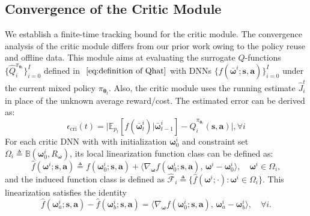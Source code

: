 \documentclass{IEEEtran}
\begin{document}
\subsection{Convergence of the Critic Module}
We establish a finite-time tracking bound for the critic module. The convergence analysis of the critic module differs from our prior work owing to the policy reuse and offline data. This module aims at evaluating the surrogate $Q$-functions $\{\hat{Q}_{i}^{\pi_{\boldsymbol{\theta}_{t}}}\}_{i=0}^{I}$ defined in $~\eqref{eq:definition of Qhat}$ with DNNs $\{f(\bar{\boldsymbol{\omega}}^{i};\boldsymbol{s},\boldsymbol{a})\}_{i=0}^{I}$ under the current mixed policy $\pi_{\boldsymbol{\theta}_{t}}$. Also, the critic module uses the running estimate $\hat{J}_{i}^{t}$ in place of the unknown average reward/cost. The estimated error can be derived as:
\begin{equation}
\epsilon_{\mathrm{cri}}(t)=\bigl|\mathbb{E_{\mathrm{\mathit{p_{t}}}}}[f(\bar{\boldsymbol{\omega}}_{t}^{i})|\bar{\boldsymbol{\omega}}_{t-1}^{i}]-\hat{Q}_{i}^{\pi_{\boldsymbol{\theta}_{t}}}(\boldsymbol{s},\boldsymbol{a})\bigr|,\forall i\label{eq:critic_error}
\end{equation}
For each critic DNN with with initialization $\boldsymbol{\omega}_{0}^{i}$ and constraint set $\Omega_{i}\triangleq\mathbb{B}(\boldsymbol{\omega}_{0}^{i},R_{\boldsymbol{\omega}})$, its local linearization function class can be defined as:
\begin{equation}
\hat{f}(\boldsymbol{\omega}^{i};\boldsymbol{s},\boldsymbol{a})\triangleq f(\boldsymbol{\omega}_{0}^{i};\boldsymbol{s},\boldsymbol{a})+\bigl\langle\nabla_{\boldsymbol{\omega}}f(\boldsymbol{\omega}_{0}^{i};\boldsymbol{s},\boldsymbol{a}),\,\boldsymbol{\omega}^{i}-\boldsymbol{\omega}_{0}^{i}\bigr\rangle,\quad\boldsymbol{\omega}^{i}\in\Omega_{i},\label{eq:local_linearization}
\end{equation}
and the induced function class is defined as $\hat{\mathcal{F}}_{i}\triangleq\{\hat{f}(\boldsymbol{\omega}^{i};\cdot):\boldsymbol{\omega}^{i}\in\Omega_{i}\}$. This linearization satisfies the identity
\begin{equation}
\hat{f}(\boldsymbol{\omega}_{a}^{i};\boldsymbol{s},\boldsymbol{a})-\hat{f}(\boldsymbol{\omega}_{b}^{i};\boldsymbol{s},\boldsymbol{a})=\bigl\langle\nabla_{\boldsymbol{\omega}}f(\boldsymbol{\omega}_{0}^{i};\boldsymbol{s},\boldsymbol{a}),\,\boldsymbol{\omega}_{a}^{i}-\boldsymbol{\omega}_{b}^{i}\bigr\rangle,\quad\forall i.
\end{equation}
\end{document}
